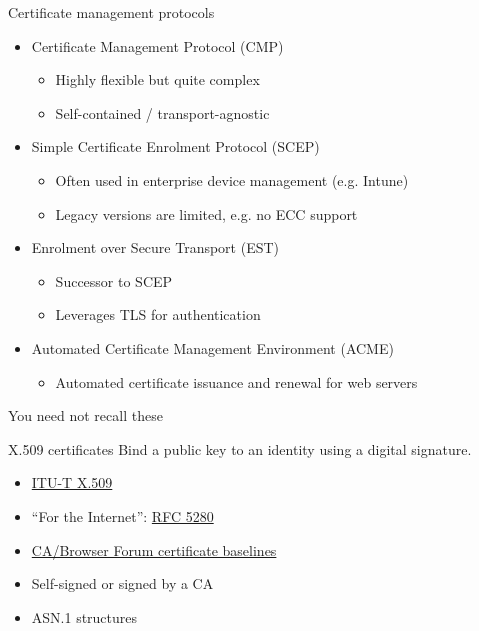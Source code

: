 \begin{frame}{Certificate management protocols}
  \begin{itemize}[<+(1)->]
    \item Certificate Management Protocol (CMP)
    \begin{itemize}
      \item Highly flexible but quite complex
      \item Self-contained / transport-agnostic
    \end{itemize}
    \item Simple Certificate Enrolment Protocol (SCEP)
    \begin{itemize}
      \item Often used in enterprise device management (e.g. Intune)
      \item Legacy versions are limited, e.g. no ECC support
    \end{itemize}
    \item Enrolment over Secure Transport (EST)
    \begin{itemize}
      \item Successor to SCEP
      \item Leverages TLS for authentication
    \end{itemize}
    \item Automated Certificate Management Environment (ACME)
    \begin{itemize}
      \item Automated certificate issuance and renewal for web servers
    \end{itemize}
  \end{itemize}

  You need not recall these
\end{frame}

\begin{frame}{X.509 certificates}
  \pause
  Bind a public key to an identity using a digital signature.
  \begin{itemize}[<+(1)->]
    \item \href{https://www.itu.int/rec/T-REC-X.509}{ITU-T X.509}
    \item \enquote{For the Internet}: \href{https://datatracker.ietf.org/doc/html/rfc5280}{RFC 5280}
    \item \href{https://cabforum.org}{CA/Browser Forum certificate baselines}
    \item Self-signed or signed by a CA
    \item ASN.1 structures
  \end{itemize}
\end{frame}

